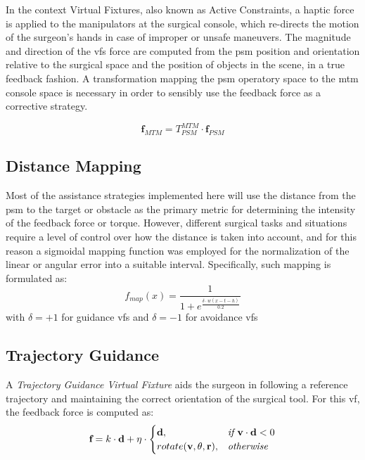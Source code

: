 \documentclass{article}
\newcommand{\vect}[1]{\textbf{#1}}
\begin{document}
\begin{multicols}{2}
In the context Virtual Fixtures, also known as Active Constraints, a haptic force is applied to the manipulators at the surgical console, which re-directs the motion of the surgeon's hands in case of improper or unsafe maneuvers. The magnitude and direction of the \acp{vf} force are computed from the \ac{psm} position and orientation relative to the surgical space and the position of objects in the scene, in a true feedback fashion. A transformation mapping the \ac{psm} operatory space to the \ac{mtm} console space is necessary in order to sensibly use the feedback force as a corrective strategy.

\begin{equation}
  \vect{f}_{MTM} = T_{PSM}^{MTM}\cdot \vect{f}_{PSM}
\end{equation}

\subsection{Distance Mapping}
Most of the assistance strategies implemented here will use the distance from the \ac{psm} to the target or obstacle as the primary metric for determining the intensity of the feedback force or torque. However, different surgical tasks and situations require a level of control over how the distance is taken into account, and for this reason a sigmoidal mapping function was employed for the normalization of the linear or angular error into a suitable interval. Specifically, such mapping is formulated as:
\begin{equation}
  f_{map}(x) = \frac{1}{1+e^{\frac{\delta\cdot w(x-t-h)}{0.2}}}
  \label{eq:sigmoidalmap}
\end{equation}
with $\delta = +1$ for guidance \acp{vf} and $\delta = -1$ for avoidance \acp{vf}

\subsection{Trajectory Guidance}
A \textit{Trajectory Guidance Virtual Fixture} aids the surgeon in following a reference trajectory and maintaining the correct orientation of the surgical tool. For this \ac{vf}, the feedback force is computed as:
\begin{equation}
    \vect{f} = k \cdot \vect{d} + \eta \cdot
    \begin{cases} 
        $$
        \vect{d}, & \textit{if         } \vect{v}\cdot\vect{d}<0 \\
         rotate(\vect{v},\theta,\vect{r}), & \textit{otherwise}
        $$
    \end{cases}
\end{equation} 



\end{multicols}
\end{document}
